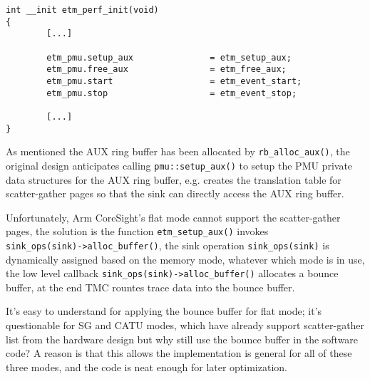 \documentclass[11pt]{diazessay} %
\def\code#1{\texttt{#1}}
\begin{document}
\begin{lstlisting}
int __init etm_perf_init(void)
{
        [...]

        etm_pmu.setup_aux               = etm_setup_aux;
        etm_pmu.free_aux                = etm_free_aux;
        etm_pmu.start                   = etm_event_start;
        etm_pmu.stop                    = etm_event_stop;

        [...]
}
\end{lstlisting}

As mentioned the AUX ring buffer has been allocated by \code{rb\_alloc\_aux()}, the original design anticipates calling \code{pmu::setup\_aux()} to setup the PMU private data structures for the AUX ring buffer, e.g. creates the translation table for scatter-gather pages so that the sink can directly access the AUX ring buffer.

Unfortunately, Arm CoreSight's flat mode cannot support the scatter-gather pages, the solution is the function \code{etm\_setup\_aux()} invokes\\\code{sink\_ops(sink)->alloc\_buffer()}, the sink operation \code{sink\_ops(sink)} is dynamically assigned based on the memory mode, whatever which mode is in use, the low level callback \code{sink\_ops(sink)->alloc\_buffer()} allocates a bounce buffer, at the end TMC rountes trace data into the bounce buffer.

It's easy to understand for applying the bounce buffer for flat mode; it's questionable for SG and CATU modes, which have already support scatter-gather list from the hardware design but why still use the bounce buffer in the software code?  A reason is that this allows the implementation is general for all of these three modes, and the code is neat enough for later optimization.
\end{document}

